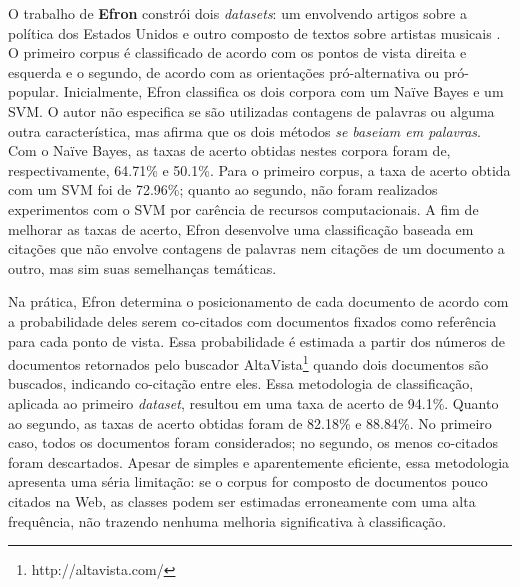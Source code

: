 
O trabalho de \textbf{Efron} constrói dois \emph{datasets}: um envolvendo artigos sobre a política dos Estados Unidos e outro composto de textos sobre artistas musicais \cite{efron}. O primeiro corpus é classificado de acordo com os pontos de vista direita e esquerda e o segundo, de acordo com as orientações pró-alternativa ou pró-popular. Inicialmente, Efron classifica os dois corpora com um Naïve Bayes e um SVM. O autor não especifica se são utilizadas contagens de palavras ou alguma outra característica, mas afirma que os dois métodos \emph{se baseiam em palavras}. Com o Naïve Bayes, as taxas de acerto obtidas nestes corpora foram de, respectivamente, 64.71\% e 50.1\%. Para o primeiro corpus, a taxa de acerto obtida com um SVM foi de 72.96\%; quanto ao segundo, não foram realizados experimentos com o SVM por carência de recursos computacionais. A fim de melhorar as taxas de acerto,  Efron desenvolve uma classificação baseada em citações que não envolve contagens de palavras nem citações de um documento a outro, mas sim suas semelhanças temáticas. 

Na prática, Efron determina o posicionamento de cada documento de acordo com a probabilidade deles serem co-citados com  documentos fixados como referência para cada ponto de vista. Essa probabilidade é estimada a partir dos números de documentos retornados pelo buscador AltaVista\footnote{http://altavista.com/} quando dois documentos são buscados, indicando co-citação entre eles. Essa metodologia de classificação, aplicada ao primeiro \emph{dataset}, resultou em uma taxa de acerto de 94.1\%. Quanto ao segundo, as taxas de acerto obtidas foram de 82.18\% e 88.84\%. No primeiro caso, todos os documentos foram considerados; no segundo, os menos co-citados foram descartados. Apesar de simples e aparentemente eficiente, essa metodologia apresenta uma séria limitação: se o corpus for composto de documentos pouco citados na Web, as classes podem ser estimadas erroneamente com uma alta frequência, não trazendo nenhuma melhoria significativa à classificação.

